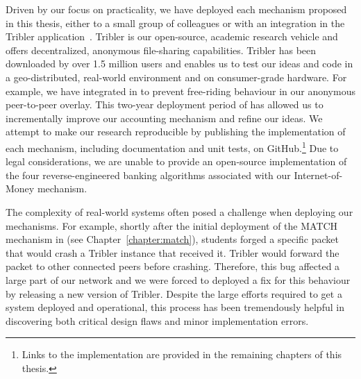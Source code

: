 Driven by our focus on practicality, we have deployed each mechanism proposed in this thesis, either to a small group of colleagues or with an integration in the Tribler application~\cite{zeilemaker2011tribler}.
Tribler is our open-source, academic research vehicle and offers decentralized, anonymous file-sharing capabilities.
Tribler has been downloaded by over 1.5 million users and enables us to test our ideas and code in a geo-distributed, real-world environment and on consumer-grade hardware.
For example, we have integrated \TrustChain{} in \Tribler{} to prevent free-riding behaviour in our anonymous peer-to-peer overlay.
This two-year deployment period of \TrustChain{} has allowed us to incrementally improve our accounting mechanism and refine our ideas.
We attempt to make our research reproducible by publishing the implementation of each mechanism, including documentation and unit tests, on GitHub.\footnote{Links to the implementation are provided in the remaining chapters of this thesis.}
Due to legal considerations, we are unable to provide an open-source implementation of the four reverse-engineered banking algorithms associated with our Internet-of-Money mechanism.

The complexity of real-world systems often posed a challenge when deploying our mechanisms.
For example, shortly after the initial deployment of the MATCH mechanism in \Tribler{} (see Chapter~\ref{chapter:match}), students forged a specific packet that would crash a Tribler instance that received it.
Tribler would forward the packet to other connected peers before crashing.
Therefore, this bug affected a large part of our network and we were forced to deployed a fix for this behaviour by releasing a new version of Tribler.
Despite the large efforts required to get a system deployed and operational, this process has been tremendously helpful in discovering both critical design flaws and minor implementation errors.



